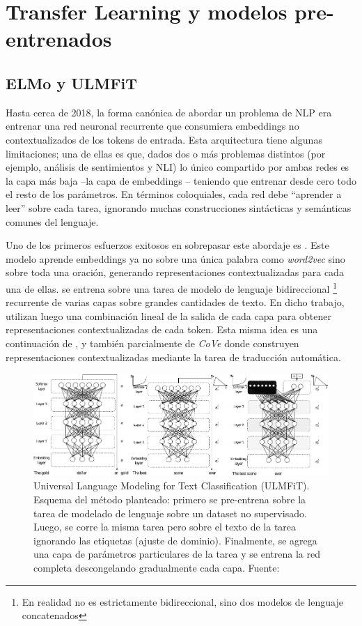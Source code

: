 \section{Transfer Learning y modelos pre-entrenados}

\subsection{ELMo y ULMFiT}
\label{subsec:elmo}

Hasta cerca de 2018, la forma canónica de abordar un problema de NLP era entrenar una red neuronal recurrente que consumiera embeddings no contextualizados de los tokens de entrada. Esta arquitectura tiene algunas limitaciones; una de ellas es que, dados dos o más problemas distintos (por ejemplo, análisis de sentimientos y NLI) lo único compartido por ambas redes es la capa más baja --la capa de embeddings -- teniendo que entrenar desde cero todo el resto de los parámetros. En términos coloquiales, cada red debe ``aprender a leer'' sobre cada tarea, ignorando muchas construcciones sintácticas y semánticas comunes del lenguaje.

Uno de los primeros esfuerzos exitosos en sobrepasar este abordaje es \elmo{} \cite{peters2018}. Este modelo aprende embeddings ya no sobre una única palabra como \emph{word2vec} sino sobre toda una oración, generando representaciones contextualizadas para cada una de ellas. \elmo{} se entrena sobre una tarea de modelo de lenguaje bidireccional \footnote{En realidad no es estrictamente bidireccional, sino dos modelos de lenguaje concatenados} recurrente de varias capas sobre grandes cantidades de texto. En dicho trabajo, utilizan luego una combinación lineal de la salida de cada capa para obtener representaciones contextualizadas de cada token. Esta misma idea es una continuación de \citet{peters2017semi}, y también parcialmente de \emph{CoVe} \cite{mccann2017learned} donde construyen representaciones contextualizadas mediante la tarea de traducción automática.

\begin{figure}[t]
    \centering
    \includegraphics[width=\textwidth]{img/02/ulmfit.pdf}
    \caption{Universal Language Modeling for Text Classification (ULMFiT). Esquema del método planteado: primero se pre-entrena sobre la tarea de modelado de lenguaje sobre un dataset no supervisado. Luego, se corre la misma tarea pero sobre el texto de la tarea ignorando las etiquetas (ajuste de dominio). Finalmente, se agrega una capa de parámetros particulares de la tarea y se entrena la red completa descongelando gradualmente cada capa. Fuente: \citet{howard-ruder-2018-universal}}
    \label{fig:ulmfit}
\end{figure}

